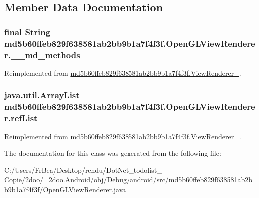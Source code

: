 \subsection{Member Data Documentation}
\hypertarget{classmd5b60ffeb829f638581ab2bb9b1a7f4f3f_1_1_open_g_l_view_renderer_55f0f0092c5140b38cf1f7aba5594097}{
\subsubsection[{\_\-\_\-md\_\-methods}]{\setlength{\rightskip}{0pt plus 5cm}final String {\bf md5b60ffeb829f638581ab2bb9b1a7f4f3f.OpenGLViewRenderer.\_\-\_\-md\_\-methods}}}
\label{classmd5b60ffeb829f638581ab2bb9b1a7f4f3f_1_1_open_g_l_view_renderer_55f0f0092c5140b38cf1f7aba5594097}




Reimplemented from \hyperlink{classmd5b60ffeb829f638581ab2bb9b1a7f4f3f_1_1_view_renderer__2_80b609e3e4054c380887d4dc2907a875}{md5b60ffeb829f638581ab2bb9b1a7f4f3f.ViewRenderer\_}.\hypertarget{classmd5b60ffeb829f638581ab2bb9b1a7f4f3f_1_1_open_g_l_view_renderer_05996987d150ac96a4aabf32c1f4901c}{
\subsubsection[{refList}]{\setlength{\rightskip}{0pt plus 5cm}java.util.ArrayList {\bf md5b60ffeb829f638581ab2bb9b1a7f4f3f.OpenGLViewRenderer.refList}}}
\label{classmd5b60ffeb829f638581ab2bb9b1a7f4f3f_1_1_open_g_l_view_renderer_05996987d150ac96a4aabf32c1f4901c}




Reimplemented from \hyperlink{classmd5b60ffeb829f638581ab2bb9b1a7f4f3f_1_1_view_renderer__2_6c151401977148a92c515e9c7de1aaf8}{md5b60ffeb829f638581ab2bb9b1a7f4f3f.ViewRenderer\_}.

The documentation for this class was generated from the following file:\begin{CompactItemize}
\item 
C:/Users/FrBea/Desktop/rendu/DotNet\_\-todolist\_ - Copie/2doo/\_\-2doo.Android/obj/Debug/android/src/md5b60ffeb829f638581ab2bb9b1a7f4f3f/\hyperlink{_open_g_l_view_renderer_8java}{OpenGLViewRenderer.java}\end{CompactItemize}
